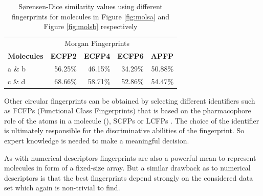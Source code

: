 \begin{table}[h]
	\centering
	\begin{tabularx}{0.57\textwidth}{l
			r
			r 
			r
			r
		}
		\toprule
		& \multicolumn{3}{c}{Morgan Fingerprints} &   \\
		\cmidrule(r){2-4} 
		\bf{Molecules}  &  \multicolumn{1}{c}{\bf{ECFP2}}   & \multicolumn{1}{c}{\bf{ECFP4}}&  \multicolumn{1}{c}{\bf{ECFP6}} & \multicolumn{1}{c}{\bf{APFP}} \\
		\midrule
		a \& b   & 56.25\%   &  46.15\%  & 34.29\%    & 50.88\%   \\
		
		c \& d   & 68.66\%  &  58.71\% &  52.86\%  & 54.47\% \\
		
		
		\bottomrule
	\end{tabularx} 
	
	
	\caption{Sørensen-Dice similarity values \cite{sorensen1948method, dice1945measures} using different fingerprints for molecules in Figure \ref{fig:molsa} and Figure \ref{fig:molsb} respectively}
	\label{tab:dis_metric_2Dshapes}
\end{table}


Other circular fingerprints can be obtained by selecting different identifiers such as FCFPs (Functional Class Fingerprints) that is based on the pharmacophore role of the atoms in a molecule (\cite{ECFP}), SCFPs \citep{SCFP} or LCFPs \citep{LCFP}. The choice of the identifier is ultimately responsible for the discriminative abilities of the fingerprint. So expert knowledge is needed to make a meaningful decision.

As with numerical descriptors fingerprints are also a powerful mean to represent molecules in form of a fixed-size array. But a similar drawback as to numerical descriptors is that the best fingerprints depend strongly on the considered data set which again is  non-trivial to find.



